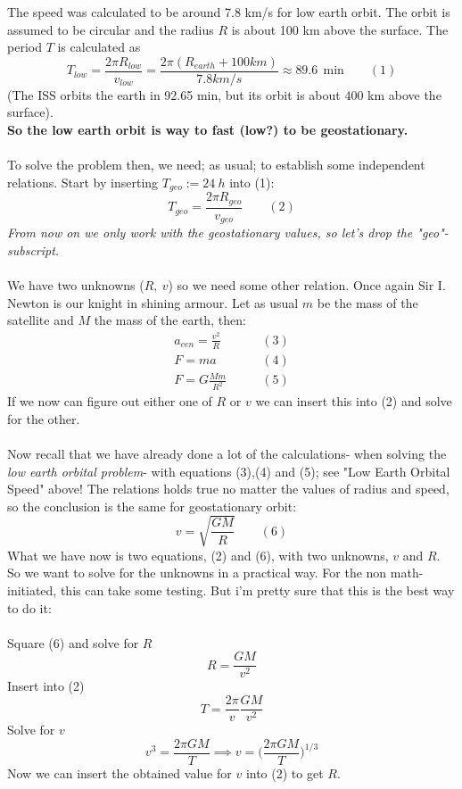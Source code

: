 \documentclass{article}
\begin{document}
The speed was calculated to be around 7.8 km/s for low earth orbit. The orbit is assumed to be circular and the radius $R$ is about 100 km above the surface. The period $T$ is calculated as
$$
T_{low} = \frac{2\pi R_{low}}{v_{low}} = \frac{2\pi(R_{earth}+100km)}{7.8 km/s} \approx 89.6 \ \  \textrm{min} \quad \quad (1)
$$
(The ISS orbits the earth in 92.65 min, but its orbit is about 400 km above the surface).
\\
\textbf{So the low earth orbit is way to fast (low?) to be geostationary.}
\\ \\
To solve the problem then, we need; as usual; to establish some independent relations. Start by inserting $T_{geo}:=24 \ h$ into (1):
$$
T_{geo}=\frac{2\pi R_{geo}}{v_{geo}} \quad \quad (2)
$$
\textit{From now on we only work with the geostationary values, so let's drop the "geo"-subscript.} 
\\ \\
We have two unknowns ($R, \ v$) so we need some other relation. Once again Sir I. Newton is our knight in shining armour. Let as usual $m$
be the mass of the
satellite and $M$ the mass of the earth, then:
\begin{equation*}
    \begin{split}
        a_{cen}=\frac{v^2}{R} \quad \quad &(3) \\
        F=ma  \quad \quad &(4)
        \\
        F=G\frac{Mm}{R^2} \quad \quad &(5)
    \end{split}
\end{equation*}
If we now can figure out either one of $R$ or $v$ we can insert this into (2) and solve for the other.
\\ \\
Now recall that we have already done a lot of the calculations- when solving the \textit{low earth orbital problem}- with equations (3),(4) and (5); see "Low Earth Orbital Speed" above! The relations holds true no matter the values of radius and speed, so the conclusion is the same for geostationary orbit:
$$
v=\sqrt{\frac{GM}{R}} \quad \quad (6)
$$
What we have now is two equations, (2) and (6), with two unknowns, $v$ and $R$. So we want to solve for the unknowns in a practical way. For the non math-initiated, this can take some testing. But i'm pretty sure that this is the best way to do it:
\\ \\
Square (6) and solve for $R$
$$
R=\frac{GM}{v^2}
$$
Insert into (2)
$$
T=\frac{2\pi}{v}\frac{GM}{v^2}
$$
Solve for $v$
$$
v^3=\frac{2\pi GM}{T} \implies v=\Big(\frac{2\pi GM}{T}\Big)^{1/3}
$$
Now we can insert the obtained value for $v$ into (2) to get $R$.
\end{document}
